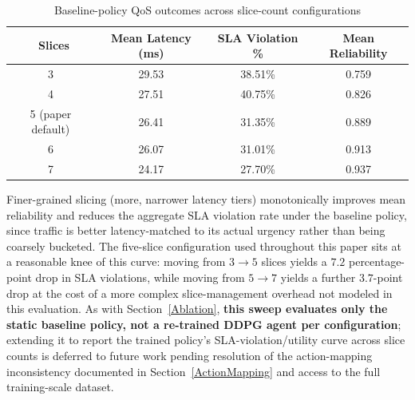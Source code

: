 \documentclass[10pt,journal,compsoc]{IEEEtran}
\begin{document}
\begin{table}[!t]
\centering
\caption{Baseline-policy QoS outcomes across slice-count configurations}
\label{tab:slicesweep}
\begin{tabular}{|c|c|c|c|}
\hline
\textbf{\ Slices} & \textbf{Mean Latency (ms)} & \textbf{SLA Violation \%} & \textbf{Mean Reliability} \\
\hline
3 & 29.53 & 38.51\% & 0.759 \\
\hline
4 & 27.51 & 40.75\% & 0.826 \\
\hline
5 (paper default) & 26.41 & 31.35\% & 0.889 \\
\hline
6 & 26.07 & 31.01\% & 0.913 \\
\hline
7 & 24.17 & 27.70\% & 0.937 \\
\hline
\end{tabular}
\end{table}
 
Finer-grained slicing (more, narrower latency tiers) monotonically improves
mean reliability and reduces the aggregate SLA violation rate under the
baseline policy, since traffic is better latency-matched to its actual
urgency rather than being coarsely bucketed. The five-slice configuration
used throughout this paper sits at a reasonable knee of this curve: moving
from $3\to5$ slices yields a $7.2$ percentage-point drop in SLA violations,
while moving from $5\to7$ yields a further $3.7$-point drop at the cost of a
more complex slice-management overhead not modeled in this evaluation.
As with Section~\ref{Ablation}, \textbf{this sweep evaluates only the static
baseline policy, not a re-trained DDPG agent per configuration}; extending it
to report the trained policy's SLA-violation/utility curve across slice
counts is deferred to future work pending resolution of the action-mapping
inconsistency documented in Section~\ref{ActionMapping} and access to the
full training-scale dataset.
 
\end{document}
